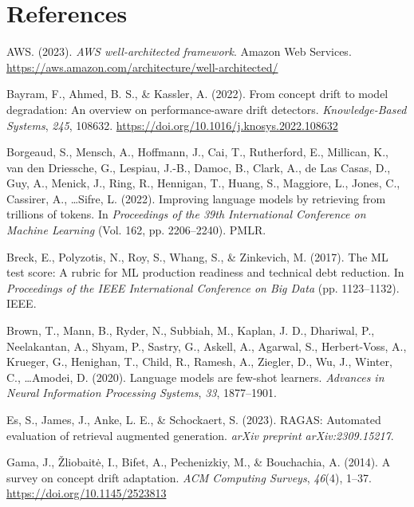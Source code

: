\documentclass[12pt,a4paper]{report}
\begin{document}
\chapter*{References}

\begin{flushleft}
\setlength{\parskip}{8pt}
\setlength{\hangindent}{0.5in}

AWS. (2023). \textit{AWS well-architected framework}. Amazon Web Services. \url{https://aws.amazon.com/architecture/well-architected/}

Bayram, F., Ahmed, B. S., \& Kassler, A. (2022). From concept drift to model degradation: An overview on performance-aware drift detectors. \textit{Knowledge-Based Systems}, \textit{245}, 108632. \url{https://doi.org/10.1016/j.knosys.2022.108632}

Borgeaud, S., Mensch, A., Hoffmann, J., Cai, T., Rutherford, E., Millican, K., van den Driessche, G., Lespiau, J.-B., Damoc, B., Clark, A., de Las Casas, D., Guy, A., Menick, J., Ring, R., Hennigan, T., Huang, S., Maggiore, L., Jones, C., Cassirer, A., \ldots Sifre, L. (2022). Improving language models by retrieving from trillions of tokens. In \textit{Proceedings of the 39th International Conference on Machine Learning} (Vol. 162, pp. 2206--2240). PMLR.

Breck, E., Polyzotis, N., Roy, S., Whang, S., \& Zinkevich, M. (2017). The ML test score: A rubric for ML production readiness and technical debt reduction. In \textit{Proceedings of the IEEE International Conference on Big Data} (pp. 1123--1132). IEEE.

Brown, T., Mann, B., Ryder, N., Subbiah, M., Kaplan, J. D., Dhariwal, P., Neelakantan, A., Shyam, P., Sastry, G., Askell, A., Agarwal, S., Herbert-Voss, A., Krueger, G., Henighan, T., Child, R., Ramesh, A., Ziegler, D., Wu, J., Winter, C., \ldots Amodei, D. (2020). Language models are few-shot learners. \textit{Advances in Neural Information Processing Systems}, \textit{33}, 1877--1901.

Es, S., James, J., Anke, L. E., \& Schockaert, S. (2023). RAGAS: Automated evaluation of retrieval augmented generation. \textit{arXiv preprint arXiv:2309.15217}.

Gama, J., \v{Z}liobait\.{e}, I., Bifet, A., Pechenizkiy, M., \& Bouchachia, A. (2014). A survey on concept drift adaptation. \textit{ACM Computing Surveys}, \textit{46}(4), 1--37. \url{https://doi.org/10.1145/2523813}


\end{flushleft}
\end{document}
